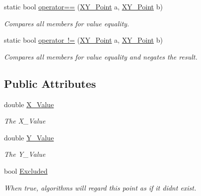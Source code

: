 \begin{DoxyCompactItemize}
static bool \mbox{\hyperlink{struct_c_s_i_1_1_library_1_1_data_types_1_1_x_y___point_a31035324cc5360f8e897224137a60302}{operator==}} (\mbox{\hyperlink{struct_c_s_i_1_1_library_1_1_data_types_1_1_x_y___point}{X\+Y\+\_\+\+Point}} a, \mbox{\hyperlink{struct_c_s_i_1_1_library_1_1_data_types_1_1_x_y___point}{X\+Y\+\_\+\+Point}} b)
\begin{DoxyCompactList}\small\item\em Compares all members for value equality. \end{DoxyCompactList}\item 
static bool \mbox{\hyperlink{struct_c_s_i_1_1_library_1_1_data_types_1_1_x_y___point_a3edf55b3b46e4f54e257efdb6821176c}{operator !=}} (\mbox{\hyperlink{struct_c_s_i_1_1_library_1_1_data_types_1_1_x_y___point}{X\+Y\+\_\+\+Point}} a, \mbox{\hyperlink{struct_c_s_i_1_1_library_1_1_data_types_1_1_x_y___point}{X\+Y\+\_\+\+Point}} b)
\begin{DoxyCompactList}\small\item\em Compares all members for value equality and negates the result. \end{DoxyCompactList}\end{DoxyCompactItemize}
\subsection*{Public Attributes}
\begin{DoxyCompactItemize}
\item 
double \mbox{\hyperlink{struct_c_s_i_1_1_library_1_1_data_types_1_1_x_y___point_a1fe70fe10cfee9839b032e5e8ed5a89b}{X\+\_\+\+Value}}
\begin{DoxyCompactList}\small\item\em The X\+\_\+\+Value \end{DoxyCompactList}\item 
double \mbox{\hyperlink{struct_c_s_i_1_1_library_1_1_data_types_1_1_x_y___point_aea9cfab5f9b44a28e22dd88bc4e1bc7f}{Y\+\_\+\+Value}}
\begin{DoxyCompactList}\small\item\em The Y\+\_\+\+Value \end{DoxyCompactList}\item 
bool \mbox{\hyperlink{struct_c_s_i_1_1_library_1_1_data_types_1_1_x_y___point_ad68cafc4f9fbf764346eb821d885e9fe}{Excluded}}
\begin{DoxyCompactList}\small\item\em When true, algorithms will regard this point as if it didn\textquotesingle{}t exist. \end{DoxyCompactList}\end{DoxyCompactItemize}


